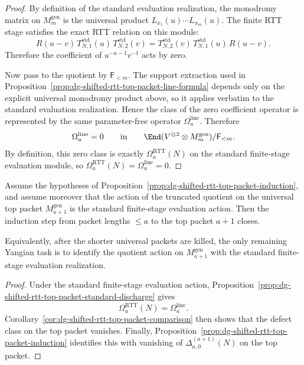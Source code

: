 \begin{proof}
By definition of the standard evaluation realization, the monodromy
matrix on $M_m^{\mathrm{gen}}$ is the universal product
$L_{x_1}(u)\cdots L_{x_m}(u)$.  The finite RTT stage satisfies the
exact RTT relation on this module:
\[
R(u-v)\,T_{N,1}^{\mathrm{std}}(u)\,T_{N,2}^{\mathrm{std}}(v)
=
T_{N,2}^{\mathrm{std}}(v)\,T_{N,1}^{\mathrm{std}}(u)\,R(u-v).
\]
Therefore the coefficient of $u^{-a-1}v^{-1}$ acts by zero.

Now pass to the quotient by $\mathsf{F}_{<m}$.  The support extraction
used in
Proposition~\ref{prop:dg-shifted-rtt-top-packet-line-formula}
depends only on the explicit universal monodromy product above, so it
applies verbatim to the standard evaluation realization.  Hence the
class of the zero coefficient operator is represented by the same
parameter-free operator $\Omega_a^{\mathrm{line}}$.  Therefore
\[
\Omega_a^{\mathrm{line}}=0
\qquad\text{in}\qquad
\End(V^{\otimes 2}\otimes M_m^{\mathrm{gen}})/\mathsf{F}_{<m}.
\]
By definition, this zero class is exactly
$\Omega_a^{\mathrm{RTT}}(N)$ on the standard finite-stage evaluation
module, so $\Omega_a^{\mathrm{RTT}}(N)=\Omega_a^{\mathrm{line}}=0$.
\end{proof}

\begin{corollary}
\label{cor:dg-shifted-rtt-top-packet-conditional-closure}
Assume the hypotheses of
Proposition~\ref{prop:dg-shifted-rtt-top-packet-induction}, and assume
moreover that the action of the truncated quotient on the universal top
packet $M_{a+1}^{\mathrm{gen}}$ is the standard finite-stage evaluation
action.  Then the induction step from packet lengths $\le a$ to the top
packet $a+1$ closes.

Equivalently, after the shorter universal packets are killed, the only
remaining Yangian task is to identify the quotient action on
$M_{a+1}^{\mathrm{gen}}$ with the standard finite-stage evaluation
realization.
\end{corollary}

\begin{proof}
Under the standard finite-stage evaluation action,
Proposition~\ref{prop:dg-shifted-rtt-top-packet-standard-discharge}
gives
\[
\Omega_a^{\mathrm{RTT}}(N)=\Omega_a^{\mathrm{line}}.
\]
Corollary~\ref{cor:dg-shifted-rtt-top-packet-comparison} then shows
that the defect class on the top packet vanishes.  Finally,
Proposition~\ref{prop:dg-shifted-rtt-top-packet-induction} identifies
this with vanishing of $\Delta^{(a+1)}_{a,0}(N)$ on the top packet.
\end{proof}

